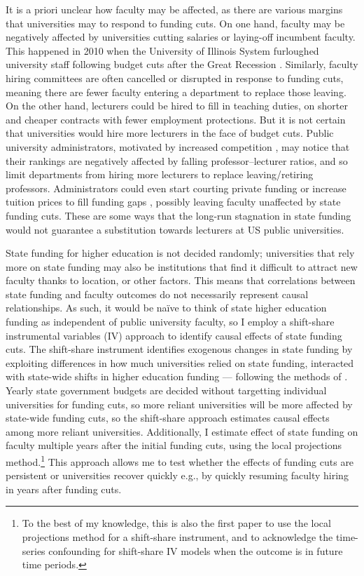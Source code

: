 It is a priori unclear how faculty may be affected, as there are various margins that universities may to respond to funding cuts.
On one hand, faculty may be negatively affected by universities cutting salaries or laying-off incumbent faculty.
This happened in 2010 when the University of Illinois System furloughed university staff following budget cuts after the Great Recession \citep{furlough2010}.
Similarly, faculty hiring committees are often cancelled or disrupted in response to funding cuts, meaning there are fewer faculty entering a department to replace those leaving.
On the other hand, lecturers could be hired to fill in teaching duties, on shorter and cheaper contracts with fewer employment protections.
But it is not certain that universities would hire more lecturers in the face of budget cuts.
Public university administrators, motivated by increased competition \citep{hoxby2009changing,urquiola2020markets}, may notice that their rankings are negatively affected by falling professor--lecturer ratios, and so limit departments from hiring more lecturers to replace leaving/retiring professors.
Administrators could even start courting private funding or increase tuition prices to fill funding gaps \citep{bound2019public}, possibly leaving faculty unaffected by state funding cuts.
These are some ways that the long-run stagnation in state funding would not guarantee a substitution towards lecturers at US public universities.

State funding for higher education is not decided randomly;
universities that rely more on state funding may also be institutions that find it difficult to attract new faculty thanks to location, or other factors.
This means that correlations between state funding and faculty outcomes do not necessarily represent causal relationships.
As such, it would be na\"ive to think of state higher education funding as independent of public university faculty, so I employ a shift-share instrumental variables (IV) approach to identify causal effects of state funding cuts.
The shift-share instrument identifies exogenous changes in state funding by exploiting differences in how much universities relied on state funding, interacted with state-wide shifts in higher education funding --- following the methods of \cite{NBERw23736,NBERw27885}.
Yearly state government budgets are decided without targetting individual universities for funding cuts, so more reliant universities will be more affected by state-wide funding cuts, so the shift-share approach estimates causal effects among more reliant universities.
Additionally, I estimate effect of state funding on faculty multiple years after the initial funding cuts, using the local projections method.\footnote{
    To the best of my knowledge, this is also the first paper to use the local projections method for a shift-share instrument, and to acknowledge the time-series confounding for shift-share IV models when the outcome is in future time periods.
}
This approach allows me to test whether the effects of funding cuts are persistent or universities recover quickly e.g., by quickly resuming faculty hiring in years after funding cuts.

